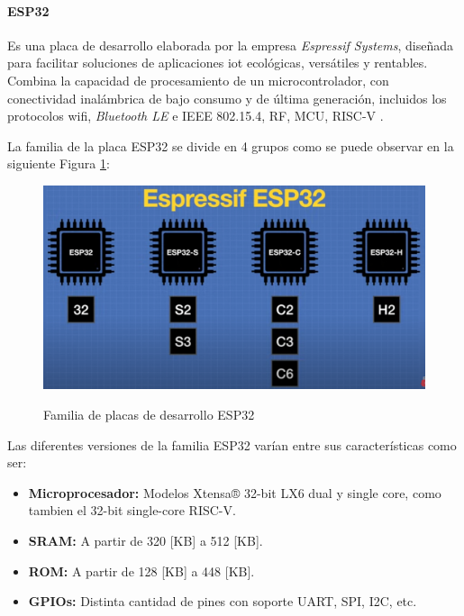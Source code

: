 \paragraph{ESP32}
Es una placa de desarrollo elaborada por la empresa \textit{Espressif Systems}, diseñada para facilitar soluciones de aplicaciones \acrshort{iot} ecológicas, versátiles y rentables. Combina la capacidad de procesamiento de un microcontrolador, con conectividad inalámbrica de bajo consumo y de última generación, incluidos los protocolos \acrfull{wifi}, \textit{Bluetooth LE} e IEEE 802.15.4, RF, MCU, RISC-V \citep{espressif}.

La familia de la placa ESP32 se divide en 4 grupos como se puede observar en la siguiente Figura \ref{fig:esp32fam}:
\begin{figure}[!htb]
    \centering
    \caption{Familia de placas de desarrollo ESP32} %
    {\includegraphics[width=0.8\columnwidth]{Figuras/esp32fam.png}}\\
    \label{fig:esp32fam}
\end{figure}
\newline
Las diferentes versiones de la familia ESP32 varían entre sus características como ser:
\begin{itemize}
    \item \textbf{Microprocesador:} Modelos Xtensa® 32-bit LX6 dual y single core, como tambien el 32-bit single-core RISC-V.
    \item \textbf{SRAM:} A partir de 320 [KB] a 512 [KB].
    \item \textbf{ROM:} A partir de 128 [KB] a 448 [KB].
    \item \textbf{GPIOs:} Distinta cantidad de pines con soporte UART, SPI, I2C, etc.
\end{itemize}

